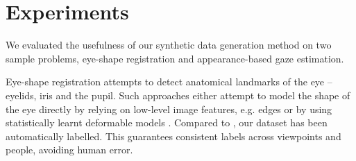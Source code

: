 
\section{Experiments}




% 


We evaluated the usefulness of our synthetic data generation method on two sample problems, eye-shape registration and appearance-based gaze estimation.

Eye-shape registration attempts to detect anatomical landmarks of the eye -- eyelids, iris and the pupil. 
Such approaches either attempt to model the shape of the eye directly by relying on low-level image features, e.g. edges \cite{wood2014eyetab, swirski2012robust} or by using statistically learnt deformable models \cite{alabort2014statistically}. 
Compared to \citet{alabort2014statistically}, our dataset has been automatically labelled. This guarantees consistent labels across viewpoints and people, avoiding human error.

